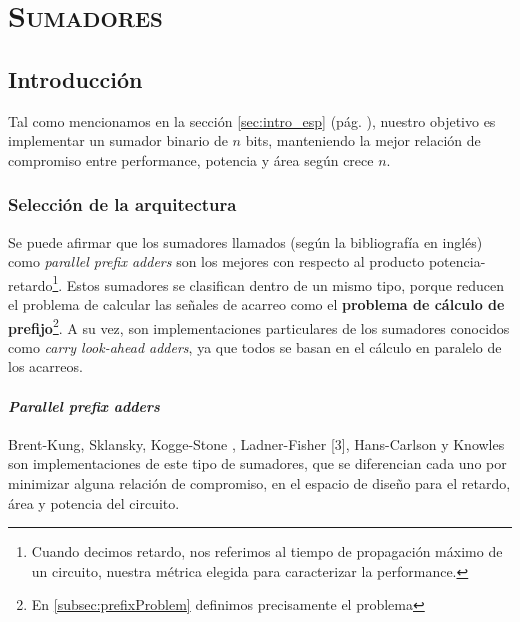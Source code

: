 



\chapter{ \textsc{ Sumadores } }\label{diseñoDigital}
	
\section{Introducción}
Tal como mencionamos en la sección \ref{sec:intro_esp} (pág. \pageref{sec:intro_esp}), nuestro objetivo es implementar un sumador binario de $n$ bits, manteniendo la mejor relación de compromiso entre performance, potencia y área según crece \(n\).


\subsection{Selección de la arquitectura}\label{sec:selección_arquitectura}

Se puede afirmar que los sumadores llamados (según la bibliografía en inglés) como \emph{parallel prefix adders} son los mejores con respecto al producto potencia-retardo\footnote{Cuando decimos retardo, nos referimos al tiempo de propagación máximo de un circuito, nuestra métrica elegida para caracterizar la performance.}.  Estos sumadores se clasifican dentro de un mismo tipo, porque reducen el problema de calcular las señales de acarreo como el \textbf{problema de cálculo de prefijo}\footnote{En \ref{subsec:prefixProblem} definimos precisamente el problema}. A su vez, son implementaciones particulares de los sumadores  conocidos como \emph{carry look-ahead adders}, ya que todos se basan en el cálculo en paralelo de los acarreos.
\subsubsection{\emph{Parallel prefix adders}}
Brent-Kung\cite{brent-kung}, Sklansky\cite{sklansky}, Kogge-Stone \cite{kogge-stone}, Ladner-Fisher [3], Hans-Carlson\cite{kogge-stone} y Knowles\cite{knowles} son implementaciones de este tipo de sumadores, que se diferencian cada uno por minimizar alguna relación de compromiso, en el espacio de diseño para el retardo, área y potencia\cite{Sugla-Carlson} del circuito.

